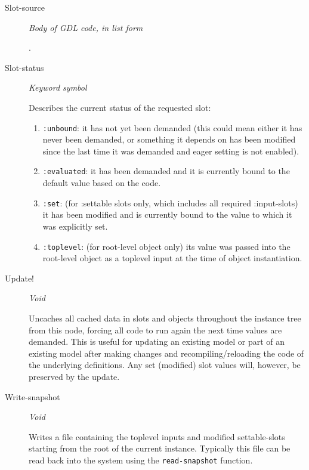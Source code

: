 \documentclass [11pt]{book}
\begin{document}
\begin{itemize}
\begin{description}
\item [Slot-source]
\emph{Body of GDL code, in list form}

.




\item [Slot-status]
\emph{Keyword symbol}

 Describes the current status of the requested slot:


\begin{enumerate}

\item \texttt{:unbound}: it has not yet been demanded (this could mean either
it has never been demanded, or something it depends on has been
modified since the last time it was demanded and eager setting is not enabled).


\item \texttt{:evaluated}: it has been demanded and it is currently bound to the default
value based on the code.


\item \texttt{:set}: (for :settable slots only, which includes all required :input-slots)
it has been modified and is currently bound to the value to which it was explicitly set.


\item \texttt{:toplevel}: (for root-level object only) its value was passed into the root-level
object as a toplevel input at the time of object instantiation.

\end{enumerate}






\item [Update!]
\emph{Void}

 Uncaches all cached data in slots and objects throughout the instance
tree from this node, forcing all code to run again the next time values are
demanded. This is useful for updating an existing model or part of an existing
model after making changes and recompiling/reloading the code of the underlying
definitions.  Any set (modified) slot values will, however, be preserved
by the update.




\item [Write-snapshot]
\emph{Void}

 Writes a file containing the toplevel inputs and modified settable-slots starting from the root of the
current instance. Typically this file can be read back into the system using the \texttt{read-snapshot} function.





\end{description}
\end{itemize}
\end{document}
